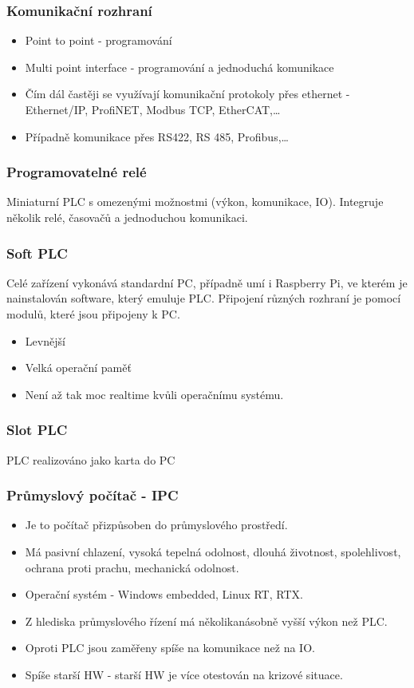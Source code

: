 \subsubsection*{Komunikační rozhraní}
\begin{itemize}
    \item Point to point - programování
    \item Multi point interface - programování a jednoduchá komunikace
    \item Čím dál častěji se využívají komunikační protokoly přes ethernet - Ethernet/IP, ProfiNET, Modbus TCP, EtherCAT,\dots
    \item Případně komunikace přes RS422, RS 485, Profibus,\dots
\end{itemize}

\subsubsection*{Programovatelné relé}
Miniaturní PLC s omezenými možnostmi (výkon, komunikace, IO). Integruje několik relé, časovačů a jednoduchou komunikaci.

\subsubsection*{Soft PLC}
Celé zařízení vykonává standardní PC, případně umí i Raspberry Pi, ve kterém je nainstalován software, který emuluje PLC. Připojení různých rozhraní je pomocí modulů, které jsou připojeny k PC.
\begin{itemize}
    \item Levnější
    \item Velká operační paměť
    \item Není až tak moc realtime kvůli operačnímu systému.
\end{itemize}

\subsubsection*{Slot PLC}
PLC realizováno jako karta do PC

\subsubsection*{Průmyslový počítač - IPC}
\begin{itemize}
    \item Je to počítač přizpůsoben do průmyslového prostředí.
    \item Má pasivní chlazení, vysoká tepelná odolnost, dlouhá životnost, spolehlivost, ochrana proti prachu, mechanická odolnost.
    \item Operační systém - Windows embedded, Linux RT, RTX.
    \item Z hlediska průmyslového řízení má několikanásobně vyšší výkon než PLC.
    \item Oproti PLC jsou zaměřeny spíše na komunikace než na IO.
    \item Spíše starší HW - starší HW je více otestován na krizové situace.
\end{itemize}

